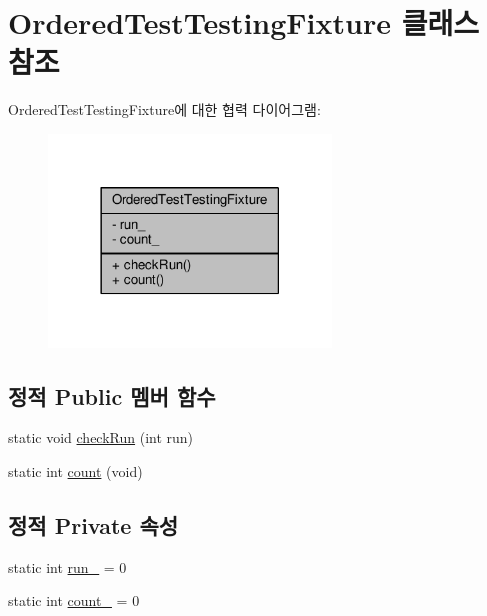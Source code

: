 \hypertarget{class_ordered_test_testing_fixture}{}\section{Ordered\+Test\+Testing\+Fixture 클래스 참조}
\label{class_ordered_test_testing_fixture}


Ordered\+Test\+Testing\+Fixture에 대한 협력 다이어그램\+:
\nopagebreak
\begin{figure}[H]
\begin{center}
\leavevmode
\includegraphics[width=213pt]{class_ordered_test_testing_fixture__coll__graph}
\end{center}
\end{figure}
\subsection*{정적 Public 멤버 함수}
\begin{DoxyCompactItemize}
\item 
static void \hyperlink{class_ordered_test_testing_fixture_a7d8b28ba6fb160a6bf877858444d8266}{check\+Run} (int run)
\item 
static int \hyperlink{class_ordered_test_testing_fixture_a356eea71d83db1d182971cadfcdb9691}{count} (void)
\end{DoxyCompactItemize}
\subsection*{정적 Private 속성}
\begin{DoxyCompactItemize}
\item 
static int \hyperlink{class_ordered_test_testing_fixture_ad35121377d37568a8e42f8a7ad98b6b4}{run\+\_\+} = 0
\item 
static int \hyperlink{class_ordered_test_testing_fixture_a9acf5084c965a76d24ec228412256bc3}{count\+\_\+} = 0
\end{DoxyCompactItemize}


